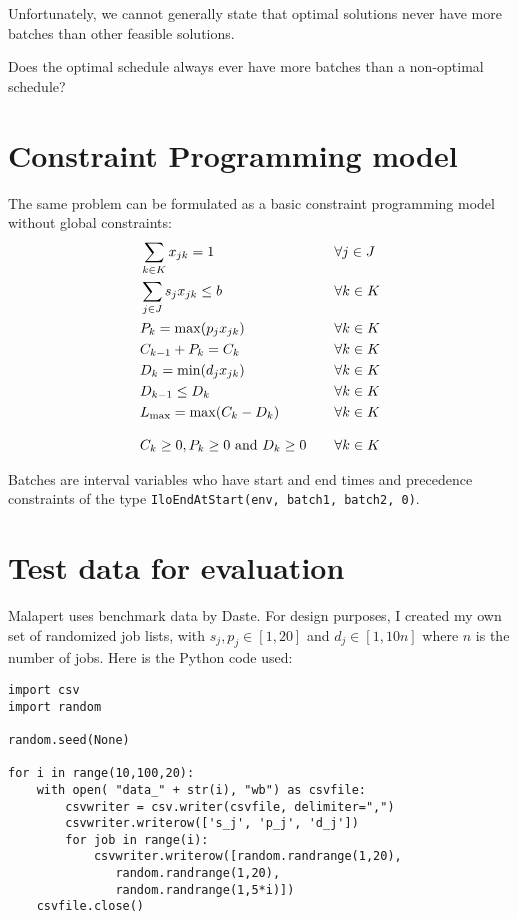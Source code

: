 \documentclass[13pt, letterpaper, twoside]{book}
\begin{document}
Unfortunately, we cannot generally state that optimal solutions never have more batches than other feasible solutions. 

Does the optimal schedule always ever have more batches than a non-optimal schedule? 


\section{Constraint Programming model}
The same problem can be formulated as a basic constraint programming model without global constraints: 
\begin{alignat}{2}
 &\sum_{k \in K} x_{jk} = 1 \quad && \forall j \in J \\
  &\sum_{j \in J} s_j x_{jk} \leq b \quad && \forall k \in K\\
  &P_k = \max(p_j x_{jk}) \quad && \forall k \in K\\
  &C_{k-1} + P_{k} = C_k \quad && \forall k \in K\\
  &D_k = \min(d_j x_{jk}) \quad && \forall k \in K\\
  &D_{k-1} \leq D_k \quad && \forall k \in K \label{malapp-edd} \\
  &L_{\text{max}} = \max(C_k - D_k) \quad && \forall k \in K\\[2ex]
  &C_k \geq 0, P_k \geq 0 \text{ and } D_k \geq 0 \quad && \forall k \in K  
\end{alignat}

Batches are interval variables who have start and end times and precedence constraints of the type \texttt{IloEndAtStart(env, batch1, batch2, 0)}. 

\section{Test data for evaluation}
Malapert uses benchmark data by Daste. For design purposes, I created my own set of randomized job lists, with $s_j, p_j \in [1, 20]$ and $d_j \in [1, 10n]$ where $n$ is the number of jobs. Here is the Python code used:

\lstset{language=Python}
\begin{lstlisting}
import csv
import random

random.seed(None)

for i in range(10,100,20):
    with open( "data_" + str(i), "wb") as csvfile:
        csvwriter = csv.writer(csvfile, delimiter=",")
        csvwriter.writerow(['s_j', 'p_j', 'd_j'])
        for job in range(i):
            csvwriter.writerow([random.randrange(1,20),
               random.randrange(1,20),
               random.randrange(1,5*i)])
    csvfile.close()
\end{lstlisting}
\end{document}
